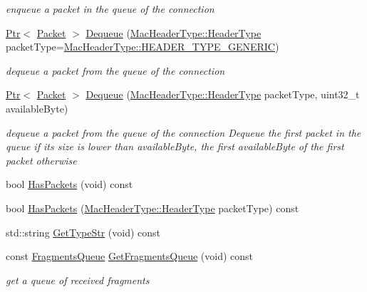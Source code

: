 \begin{DoxyCompactItemize}
\begin{DoxyCompactList}\small\item\em enqueue a packet in the queue of the connection \end{DoxyCompactList}\item 
\hyperlink{classns3_1_1Ptr}{Ptr}$<$ \hyperlink{classns3_1_1Packet}{Packet} $>$ \hyperlink{classns3_1_1WimaxConnection_a54b822cae000f9acd50c63f59219ab6a}{Dequeue} (\hyperlink{classns3_1_1MacHeaderType_a54d8fc8bc93a2b7865627965cdd31c20}{Mac\+Header\+Type\+::\+Header\+Type} packet\+Type=\hyperlink{classns3_1_1MacHeaderType_a54d8fc8bc93a2b7865627965cdd31c20a48fe5b2f20cadf78008c71469b518403}{Mac\+Header\+Type\+::\+H\+E\+A\+D\+E\+R\+\_\+\+T\+Y\+P\+E\+\_\+\+G\+E\+N\+E\+R\+IC})
\begin{DoxyCompactList}\small\item\em dequeue a packet from the queue of the connection \end{DoxyCompactList}\item 
\hyperlink{classns3_1_1Ptr}{Ptr}$<$ \hyperlink{classns3_1_1Packet}{Packet} $>$ \hyperlink{classns3_1_1WimaxConnection_a9fe33b6d2de39b28ef1b1bde9e113d6b}{Dequeue} (\hyperlink{classns3_1_1MacHeaderType_a54d8fc8bc93a2b7865627965cdd31c20}{Mac\+Header\+Type\+::\+Header\+Type} packet\+Type, uint32\+\_\+t available\+Byte)
\begin{DoxyCompactList}\small\item\em dequeue a packet from the queue of the connection Dequeue the first packet in the queue if its size is lower than available\+Byte, the first available\+Byte of the first packet otherwise \end{DoxyCompactList}\item 
bool \hyperlink{classns3_1_1WimaxConnection_a5c8097833a9c9e34011f85684922932d}{Has\+Packets} (void) const 
\item 
bool \hyperlink{classns3_1_1WimaxConnection_ab6d4cb4de219cc2e9585037d1a5cba89}{Has\+Packets} (\hyperlink{classns3_1_1MacHeaderType_a54d8fc8bc93a2b7865627965cdd31c20}{Mac\+Header\+Type\+::\+Header\+Type} packet\+Type) const 
\item 
std\+::string \hyperlink{classns3_1_1WimaxConnection_a7d022a080bafd61c5e7f68ac021761cc}{Get\+Type\+Str} (void) const 
\item 
const \hyperlink{classns3_1_1WimaxConnection_acebd6aa95ab519f5e19bd1773f62e506}{Fragments\+Queue} \hyperlink{classns3_1_1WimaxConnection_adeb165ef2cb04d19edacf92d5c751cc6}{Get\+Fragments\+Queue} (void) const 
\begin{DoxyCompactList}\small\item\em get a queue of received fragments \end{DoxyCompactList}\item 

\end{DoxyCompactItemize}
